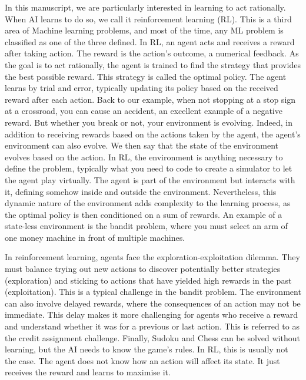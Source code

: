 In this manuscript, we are particularly interested in learning to act rationally.
When AI learns to do so, we call it reinforcement learning (RL).
This is a third area of Machine learning problems, and most of the time, any ML problem is classified as one of the three defined.
In RL, an agent acts and receives a reward after taking action.
The reward is the action's outcome, a numerical feedback.
As the goal is to act rationally, the agent is trained to find the strategy that provides the best possible reward.
This strategy is called the optimal policy.
The agent learns by trial and error, typically updating its policy based on the received reward after each action.
Back to our example, when not stopping at a stop sign at a crossroad, you can cause an accident, an excellent example of a negative reward.
But whether you break or not, your environment is evolving.
Indeed, in addition to receiving rewards based on the actions taken by the agent, the agent's environment can also evolve.
We then say that the state of the environment evolves based on the action.
In RL, the environment is anything necessary to define the problem, typically what you need to code to create a simulator to let the agent play virtually.
The agent is part of the environment but interacts with it, defining somehow inside and outside the environment.
Nevertheless, this dynamic nature of the environment adds complexity to the learning process, as the optimal policy is then conditioned on a sum of rewards.
An example of a state-less environment is the bandit problem, where you must select an arm of one money machine in front of multiple machines.

In reinforcement learning, agents face the exploration-exploitation dilemma. 
They must balance trying out new actions to discover potentially better strategies (exploration) and sticking to actions that have yielded high rewards in the past (exploitation).
This is a typical challenge in the bandit problem.
The environment can also involve delayed rewards, where the consequences of an action may not be immediate. 
This delay makes it more challenging for agents who receive a reward and understand whether it was for a previous or last action.
This is referred to as the credit assignment challenge.
Finally, Sudoku and Chess can be solved without learning, but the AI needs to know the game's rules.
In RL, this is usually not the case. 
The agent does not know how an action will affect its state.
It just receives the reward and learns to maximise it.

